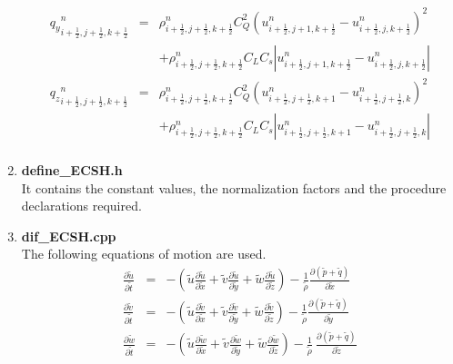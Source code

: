 \begin{enumerate}
\begin{eqnarray}
{q_y}^n_{i+\frac{1}{2},j+\frac{1}{2},k+\frac{1}{2}} &=& \rho^n_{i+\frac{1}{2},j+\frac{1}{2},k+\frac{1}{2}} C_Q^2 (u^n_{i+\frac{1}{2},j+1,k+\frac{1}{2}} - u^n_{i+\frac{1}{2},j,k+\frac{1}{2}})^2 \\ \nonumber
&& + \rho^n_{i+\frac{1}{2},j+\frac{1}{2},k+\frac{1}{2}} C_L C_s \left| u^n_{i+\frac{1}{2},j+1,k+\frac{1}{2}}-u^n_{i+\frac{1}{2},j,k+\frac{1}{2}} \right| \\
{q_z}^n_{i+\frac{1}{2},j+\frac{1}{2},k+\frac{1}{2}} &=& \rho^n_{i+\frac{1}{2},j+\frac{1}{2},k+\frac{1}{2}} C_Q^2 (u^n_{i+\frac{1}{2},j+\frac{1}{2},k+1} - u^n_{i+\frac{1}{2},j+\frac{1}{2},k})^2 \\ \nonumber
&& + \rho^n_{i+\frac{1}{2},j+\frac{1}{2},k+\frac{1}{2}} C_L C_s \left| u^n_{i+\frac{1}{2},j+\frac{1}{2},k+1}-u^n_{i+\frac{1}{2},j+\frac{1}{2},k} \right| \\
\end{eqnarray}
\normalsize

\item {\bf define\_ECSH.h}\\
It contains the constant values, the normalization factors and the procedure declarations required. 
\item {\bf dif\_ECSH.cpp}\\
The following equations of motion are used.
\begin{eqnarray}
\label{dmeEu}
\frac{\partial \tilde{u}}{\partial \tilde{t}} &=& -  \left( \tilde{u} \frac{\partial \tilde{u}}{\partial \tilde{x}} + \tilde{v} \frac{\partial \tilde{u}}{\partial \tilde{y}} +\tilde{w} \frac{\partial \tilde{u}}{\partial \tilde{z}} \right) -  \frac{1}{\tilde{\rho}}  \frac{\partial \left(\tilde{p} + \tilde{q}\right)}{\partial \tilde{x}}   \\
\frac{\partial \tilde{v}}{\partial \tilde{t}} &=& -  \left( \tilde{u} \frac{\partial \tilde{v}}{\partial \tilde{x}} + \tilde{v} \frac{\partial \tilde{v}}{\partial \tilde{y}} +\tilde{w} \frac{\partial \tilde{v}}{\partial \tilde{z}} \right) -  \frac{1}{\tilde{\rho}} \frac{\partial \left(\tilde{p} + \tilde{q}\right)}{\partial \tilde{y}}   \\
\frac{\partial \tilde{w}}{\partial \tilde{t}} &=& -  \left( \tilde{u} \frac{\partial \tilde{w}}{\partial \tilde{x}} + \tilde{v} \frac{\partial \tilde{w}}{\partial \tilde{y}} +\tilde{w} \frac{\partial \tilde{w}}{\partial \tilde{z}} \right) -  \frac{1}{\tilde{\rho}} \ \frac{\partial \left(\tilde{p} +  \tilde{q}\right)}{\partial \tilde{z}}   
\end{eqnarray}


\end{enumerate}
